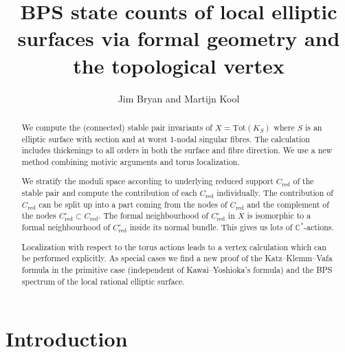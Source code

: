 \documentclass[12pt]{amsart}
\theoremstyle{definition}
\theoremstyle{property}
\newcommand\red{\mathrm{red}}
\newcommand\C{\mathbb C}
\renewcommand\_{^{}_}
\begin{document}
\title{BPS state counts of local elliptic surfaces via formal geometry and the topological vertex}
\author[J.~Bryan, M.~Kool]{Jim Bryan and Martijn Kool \vspace{-5mm}}
\maketitle

\begin{abstract}
We compute the (connected) stable pair invariants of $X =
\mathrm{Tot}(K_S)$ where $S$ is an elliptic surface with section and
at worst 1-nodal singular fibres. The calculation includes thickenings
to all orders in both the surface and fibre direction. We use a new
method combining motivic arguments and torus localization.

We stratify the moduli space according to underlying reduced support $C_{\red}$ of the stable pair and compute the contribution of each $C_{\red}$ individually. The contribution of $C_{\red}$ can be split up into a part coming from the nodes of $C_{\red}$ and the complement of the nodes $C_{\red}^{\circ} \subset C_{\red}$. The formal neighbourhood of $C_{\red}^{\circ}$ in $X$ is isomorphic to a formal neighbourhood of $C_{\red}^{\circ}$ inside its normal bundle. This gives us lots of $\C^{*}$-actions. 

Localization with respect to the torus actions leads to a vertex calculation which can be performed explicitly. As special cases we find a new proof of the Katz--Klemm--Vafa formula in the primitive case (independent of Kawai--Yoshioka's formula) and the BPS spectrum of the local rational elliptic surface.
\end{abstract}
\thispagestyle{empty}

\tableofcontents


\section{Introduction}
\end{document}
